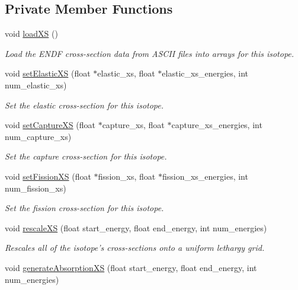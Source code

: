 \subsection*{Private Member Functions}
\begin{DoxyCompactItemize}
\item 
void \hyperlink{classIsotope_a5da77345f29ec5f28f432c244ad52656}{load\-X\-S} ()
\begin{DoxyCompactList}\small\item\em Load the E\-N\-D\-F cross-\/section data from A\-S\-C\-I\-I files into arrays for this isotope. \end{DoxyCompactList}\item 
void \hyperlink{classIsotope_a404adc028a3a6b07aa8a4102429d9566}{set\-Elastic\-X\-S} (float $\ast$elastic\-\_\-xs, float $\ast$elastic\-\_\-xs\-\_\-energies, int num\-\_\-elastic\-\_\-xs)
\begin{DoxyCompactList}\small\item\em Set the elastic cross-\/section for this isotope. \end{DoxyCompactList}\item 
void \hyperlink{classIsotope_a85f8f63b1c651d7281b9e80b37833da2}{set\-Capture\-X\-S} (float $\ast$capture\-\_\-xs, float $\ast$capture\-\_\-xs\-\_\-energies, int num\-\_\-capture\-\_\-xs)
\begin{DoxyCompactList}\small\item\em Set the capture cross-\/section for this isotope. \end{DoxyCompactList}\item 
void \hyperlink{classIsotope_a07b3f65d805c904a943dd18a9e2128fb}{set\-Fission\-X\-S} (float $\ast$fission\-\_\-xs, float $\ast$fission\-\_\-xs\-\_\-energies, int num\-\_\-fission\-\_\-xs)
\begin{DoxyCompactList}\small\item\em Set the fission cross-\/section for this isotope. \end{DoxyCompactList}\item 
void \hyperlink{classIsotope_a4371bd4097b6df0b2ddadc3dd7b01864}{rescale\-X\-S} (float start\-\_\-energy, float end\-\_\-energy, int num\-\_\-energies)
\begin{DoxyCompactList}\small\item\em Rescales all of the isotope's cross-\/sections onto a uniform lethargy grid. \end{DoxyCompactList}\item 
void \hyperlink{classIsotope_a5411a983742a91714f984360baf07613}{generate\-Absorption\-X\-S} (float start\-\_\-energy, float end\-\_\-energy, int num\-\_\-energies)

\end{DoxyCompactItemize}
